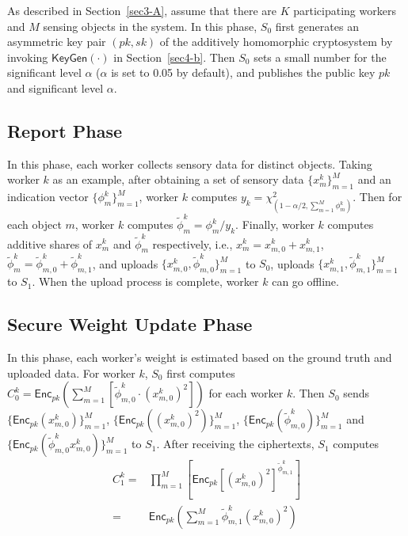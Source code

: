 \documentclass[conference]{IEEEtran}
\begin{document}
As described in Section~\ref{sec3-A}, assume that there are $K$ participating workers and $M$ sensing objects in the system.
In this phase, $S_0$ first generates an asymmetric key pair $(pk, sk)$ of the additively homomorphic cryptosystem by invoking $\mathsf{KeyGen}(\cdot)$ in Section~\ref{sec4-b}.
Then $S_0$ sets a small number for the significant level $\alpha$ ($\alpha$ is set to 0.05 by default), and publishes the public key $pk$ and significant level $\alpha$.


\subsection{Report Phase}

In this phase, each worker collects sensory data for distinct objects.
Taking worker $k$ as an example, after obtaining a set of sensory data $\{x_m^k\}_{m=1}^M$ and an indication vector $\{\phi_m^k\}_{m=1}^M$, worker $k$ computes $y_k = \chi^2_{(1-\alpha/2, \sum_{m=1}^M \phi_m^k)}$.
Then for each object $m$, worker $k$ computes $\tilde{\phi}_m^k = \phi_m^k / y_k$.
Finally, worker $k$ computes additive shares of $x_m^k$ and $\tilde{\phi}_m^k$ respectively, i.e., $x_m^k = x_{m,0}^k + x_{m,1}^k$, $\tilde{\phi}_m^k = \tilde{\phi}_{m,0}^k + \tilde{\phi}_{m,1}^k$, and uploads $\{x_{m,0}^k, \tilde{\phi}_{m,0}^k\}_{m=1}^M$ to $S_0$, uploads $\{x_{m,1}^k, \tilde{\phi}_{m,1}^k\}_{m=1}^M$ to $S_1$.
When the upload process is complete, worker $k$ can go offline.

\subsection{Secure Weight Update Phase}

In this phase, each worker's weight is estimated based on the ground truth and uploaded data.
For worker $k$, $S_0$ first computes $C_0^k = \mathsf{Enc}_{pk}(\sum_{m=1}^M [\tilde{\phi}_{m,0}^k\cdot (x_{m,0}^k)^2])$ for each worker $k$.
Then $S_0$ sends $\{\mathsf{Enc}_{pk}(x_{m,0}^k)\}_{m=1}^M$, $\{\mathsf{Enc}_{pk}((x_{m,0}^k)^2)\}_{m=1}^M$, $\{\mathsf{Enc}_{pk}(\tilde{\phi}_{m,0}^k)\}_{m=1}^M$ and $\{\mathsf{Enc}_{pk}(\tilde{\phi}_{m,0}^k x_{m,0}^k)\}_{m=1}^M$ to $S_1$.
After receiving the ciphertexts, $S_1$ computes
\begin{equation}
  \begin{split}
  C_1^k = &\prod_{m=1}^M\left[ \mathsf{Enc}_{pk}{[(x_{m,0}^k)^2]}^{\tilde{\phi}_{m,1}^k} \right] \\
        = &\mathsf{Enc}_{pk}\left(\sum_{m=1}^M \tilde{\phi}_{m,1}^k(x_{m,0}^k)^2\right)
  \end{split}
\end{equation}
\end{document}
